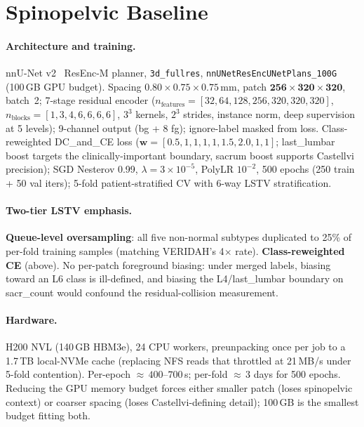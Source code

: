 \documentclass{article}
\newcommand{\VERIDAH}{VERIDAH}
\begin{document}
\section{Spinopelvic Baseline}
\label{sec:baseline}

\paragraph{Architecture and training.}
nnU-Net v2~\citep{Isensee2020NnU-Net:Segmentation,Isensee2024Nnu-netSegmentation}
ResEnc-M planner, \texttt{3d\_fullres},
\texttt{nnUNetResEncUNetPlans\_100G} (100\,GB GPU budget).
Spacing $0.80{\times}0.75{\times}0.75$\,mm, patch
$\mathbf{256{\times}320{\times}320}$, batch~2; 7-stage
residual encoder
($n_\text{features}{=}[32,64,128,256,320,320,320]$,
$n_\text{blocks}{=}[1,3,4,6,6,6,6]$, $3^3$ kernels, $2^3$
strides, instance norm, deep supervision at 5 levels);
9-channel output (bg + 8 fg); ignore-label masked from
loss. Class-reweighted DC\_and\_CE loss
($\mathbf{w}{=}[0.5,1,1,1,1,\mathbf{1.5},\mathbf{2.0},1,1]$;
last\_lumbar boost targets the clinically-important
boundary, sacrum boost supports Castellvi precision); SGD
Nesterov 0.99, $\lambda{=}3{\times}10^{-5}$, PolyLR
$10^{-2}$, 500 epochs (250 train + 50 val iters); 5-fold
patient-stratified CV with 6-way LSTV stratification.

\paragraph{Two-tier LSTV emphasis.}
\textbf{Queue-level oversampling}: all five non-normal
subtypes duplicated to 25\% of per-fold training samples
(matching \VERIDAH{}'s 4$\times$ rate).
\textbf{Class-reweighted CE} (above). No per-patch
foreground biasing: under merged labels, biasing toward
an L6 class is ill-defined, and biasing the
L4/last\_lumbar boundary on sacr\_count would confound
the residual-collision measurement.

\paragraph{Hardware.}
H200 NVL (140\,GB HBM3e), 24 CPU workers, preunpacking
once per job to a 1.7\,TB local-NVMe cache (replacing NFS
reads that throttled at 21\,MB/s under 5-fold contention).
Per-epoch ${\approx}\,400$--$700$\,s; per-fold
${\approx}\,3$ days for 500 epochs. Reducing the GPU memory
budget forces either smaller patch (loses spinopelvic
context) or coarser spacing (loses Castellvi-defining
detail); 100\,GB is the smallest budget fitting both.
\end{document}
